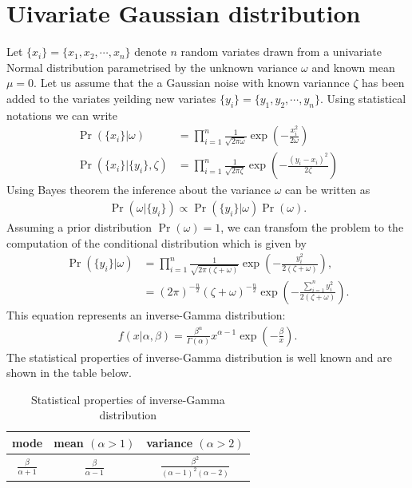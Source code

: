 \documentclass[11pt,twoside,a4paper]{article}
\begin{document}
\section{Uivariate Gaussian distribution}
  Let $\{x_i\}= \{x_1, x_2, \cdots,x_n\}$ denote $n$ random variates drawn from
  a univariate Normal distribution parametrised by the unknown variance $\omega$
  and known mean $\mu = 0$. Let us assume that the a Gaussian noise with known
  variannce $\zeta$ has been added to the variates yeilding new variates
  $\{y_i\}= \{y_1, y_2, \cdots,y_n\}$. Using statistical notations we can write
  \begin{align}
    \label{eqn_posteriors_signal_and_noise}
    \Pr \left(\{x_i\} | \omega \right) &= \prod_{i=1}^n
      \frac{1}{\sqrt{2 \pi \omega}} \exp \left(-\frac{x_i^2}{2 \omega} \right)\\
    \Pr \left(\{x_i\} | \{y_i\}, \zeta \right) &= \prod_{i=1}^n
      \frac{1}{\sqrt{2 \pi \zeta}} \exp
      \left(-\frac{\left(y_i - x_i \right)^2}{2 \zeta} \right)
  \end{align}
  Using Bayes theorem the inference about the variance $\omega$ can be written
  as
  \begin{align}
    \label{eqn_posterior_omega_given_noisy_random_variates}
    \Pr \left(\omega | \{y_i\} \right) \propto
      \Pr \left(\{y_i\} | \omega \right) \Pr(\omega).
  \end{align}
  Assuming a prior distribution $\Pr(\omega) = 1$, we can transfom the problem
  to the computation of the conditional distribution which is given by
  \begin{align}
    \Pr \left(\{y_i\} | \omega \right) &= \prod_{i=1}^n
      \frac{1}{\sqrt{2 \pi (\zeta + \omega)}} \exp
      \left(-\frac{y_i^2}{2(\zeta + \omega)} \right), \nonumber \\
    &= (2 \pi)^{-\frac{n}{2}} \left(\zeta + \omega \right)^{-\frac{n}{2}}
      \exp \left(-\frac{\sum_{i=1}^n y_i^2}{2 (\zeta + \omega)} \right) .
  \end{align}
  This equation represents an inverse-Gamma distribution:
  \begin{align}
    f(x | \alpha, \beta) = \frac{\beta^{\alpha}}{\Gamma(\alpha)} x^{\alpha - 1}
        \exp \left(-\frac{\beta}{x} \right).
  \end{align}
  The statistical properties of inverse-Gamma distribution is well known and
  are shown in the table below.
  \begin{table}
    \caption{Statistical properties of inverse-Gamma distribution}
    \label{tab_statistical_properties_of_inverse_gamma}
    \begin{center}
      \begin{tabular}{|c|c|c|}
        \hline
        mode & mean $(\alpha > 1)$ & variance $(\alpha > 2)$ \\
        \hline
        $\frac{\beta}{\alpha + 1}$ & $\frac{\beta}{\alpha - 1}$ &
          $\frac{\beta^2}{(\alpha - 1)^2 (\alpha - 2)}$ \\
        \hline
      \end{tabular}
    \end{center}
  \end{table}
\end{document}
